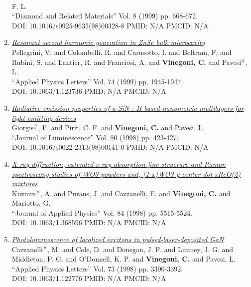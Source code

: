 \documentclass{resume}
\begin{document}
\begin{category}{~~}
\begin{enumerate}
F. L. \\ ``Diamond and Related Materials'' Vol. 8 (1999) pp. 668-672. \\ DOI: 10.1016/s0925-9635(98)00328-8 PMID: N/A PMCID: N/A\item \href{https://cvinegoni.github.io/assets/pdf/papers/1999-APL.pdf}{\it  Resonant second harmonic generation in ZnSe bulk microcavity} \\ Pellegrini, V. and Colombelli, R. and Carusotto, I. and Beltram, F. and Rubini, S. and Lantier, R. and Franciosi, A. and {\bf Vinegoni, C.} and Pavesi$^\#$, L. \\ ``Applied Physics Letters'' Vol. 74 (1999) pp. 1945-1947. \\ DOI: 10.1063/1.123736 PMID: N/A PMCID: N/A\item \href{https://cvinegoni.github.io/assets/pdf/papers/1998-JL.pdf}{\it  Radiative emission properties of a-SiN : H based nanometric multilayers for light emitting devices} \\ Giorgis$^\#$, F. and Pirri, C. F. and {\bf Vinegoni, C.} and Pavesi, L. \\ ``Journal of Luminescence'' Vol. 80 (1998) pp. 423-427. \\ DOI: 10.1016/s0022-2313(98)00141-0 PMID: N/A PMCID: N/A\item \href{https://cvinegoni.github.io/assets/pdf/papers/1998-JAP.pdf}{\it  X-ray diffraction, extended x-ray absorption fine structure and Raman spectroscopy studies of WO3 powders and, (1-x)WO3-y center dot xReO(2) mixtures} \\ Kuzmin$^\#$, A. and Purans, J. and Cazzanelli, E. and {\bf Vinegoni, C.} and Mariotto, G. \\ ``Journal of Applied Physics'' Vol. 84 (1998) pp. 5515-5524. \\ DOI: 10.1063/1.368596 PMID: N/A PMCID: N/A\item \href{https://cvinegoni.github.io/assets/pdf/papers/1998-APL.pdf}{\it  Photoluminescence of localized excitons in pulsed-laser-deposited GaN} \\ Cazzanelli$^\#$, M. and Cole, D. and Donegan, J. F. and Lunney, J. G. and Middleton, P. G. and O'Donnell, K. P. and {\bf Vinegoni, C.} and Pavesi, L. \\ ``Applied Physics Letters'' Vol. 73 (1998) pp. 3390-3392. \\ DOI: 10.1063/1.122776 PMID: N/A PMCID: N/A


\end{enumerate}
\end{category}
\end{document}
